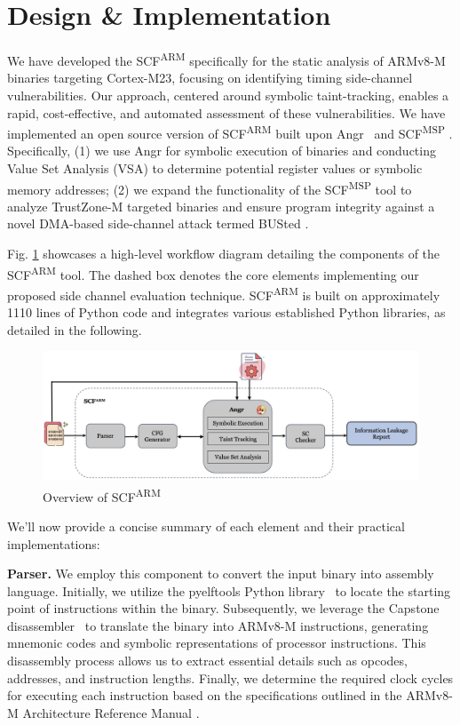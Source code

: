 \section{\tool{} Design \& Implementation}

We have developed the \ac{SCF}\textsuperscript{ARM} specifically for the
static analysis of ARMv8-M binaries targeting Cortex-M23, focusing on
identifying timing side-channel vulnerabilities. Our approach, centered
around symbolic taint-tracking, enables a rapid, cost-effective, and
automated assessment of these vulnerabilities. We have implemented an open
source  version of \ac{SCF}\textsuperscript{ARM} built upon Angr~\cite{angr} and \ac{SCF}\textsuperscript{MSP} \cite{scfmsp}. Specifically, (1) we use Angr for symbolic execution of binaries and conducting Value Set Analysis (\ac{VSA}) to determine potential register values or symbolic memory addresses; (2) we expand the functionality of the \ac{SCF}\textsuperscript{MSP} tool to analyze TrustZone-M targeted binaries and ensure program integrity against a novel DMA-based side-channel attack termed BUSted \cite{busted}. 

Fig. \ref{fig:SCFARM} showcases a high-level workflow diagram detailing the components of the \ac{SCF}\textsuperscript{ARM} tool. The dashed box denotes the core elements implementing our proposed side channel evaluation technique. \ac{SCF}\textsuperscript{ARM} is built on approximately 1110 lines of Python code and integrates various established Python libraries, as detailed in the following.

\begin{figure}
  \centering
  \includegraphics[width=.9\textwidth]{figures/SCFARM.jpg}
  \caption{Overview of \ac{SCF}\textsuperscript{ARM}}
  \label{fig:SCFARM}
\end{figure}

We'll now provide a concise summary of each element and their practical implementations:

\textbf{Parser.} We employ this component to convert the input binary into
assembly language. Initially, we utilize the pyelftools Python
library~\cite{pyelftools} to locate the starting point of instructions
within the binary. Subsequently, we leverage the Capstone
disassembler~\cite{capstone} to translate the binary into ARMv8-M instructions, generating mnemonic codes and symbolic representations of processor instructions. This disassembly process allows us to extract essential details such as opcodes, addresses, and instruction lengths. Finally, we determine the required clock cycles for executing each instruction based on the specifications outlined in the ARMv8-M Architecture Reference Manual \cite{armv8m_ref_manual}.

